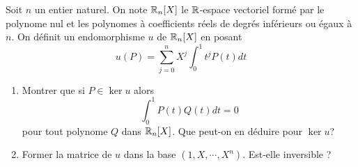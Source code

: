 Soit $n$ un entier naturel. On note $\mathbb{R}_n[X]$ le $\mathbb{R}$-espace vectoriel formé par le polynome nul et les polynomes à coefficients réels de degrés inférieurs ou égaux à $n$.\newline
On définit un endomorphisme $u$ de $\mathbb{R}_n[X]$ en posant
\[u(P)=\sum_{j=0}^n X^j \int_0^1t^jP(t)dt\] 
\begin{enumerate}
\item Montrer que si $P\in \ker u$ alors
\[\int_0^1P(t)Q(t)dt=0\]
pour tout polynome $Q$ dans $\mathbb{R}_n[X]$. Que peut-on en déduire pour $\ker u$?
\item Former la matrice de $u$ dans la base $(1,X,\cdots,X^n)$. Est-elle inversible ?
\end{enumerate}
